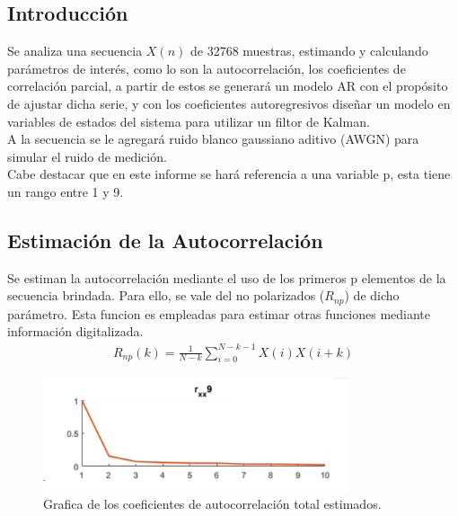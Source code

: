 







\tableofcontents
\newpage



\subsection{Introducción}

Se analiza una secuencia $X(n)$ de 32768 muestras, estimando y calculando parámetros de interés, como lo son la autocorrelación, los coeficientes de correlación parcial, a partir de estos se generará un modelo AR con el propósito de ajustar dicha serie, y con los coeficientes autoregresivos diseñar un modelo en variables de estados del sistema para utilizar un filtor de Kalman.\\
A la secuencia se le agregará ruido blanco gaussiano aditivo (AWGN) para simular el ruido de medición.\\
Cabe destacar que en este informe se hará referencia a una variable p, esta tiene un rango entre 1 y 9.\\

\subsection{Estimación de la Autocorrelación} 

Se estiman la autocorrelación mediante el uso de los primeros p elementos de la secuencia brindada. Para ello, se vale del  no polarizados ($R_{np}$) de dicho parámetro. Esta funcion es  empleadas para estimar otras funciones mediante información digitalizada.
\begin{equation}
\begin{gathered}
	R_{np}(k) = \frac{1}{N-k} \sum_{i=0}^{N-k-1} X(i)X(i+k)
\end{gathered}
\end{equation}


\begin{figure}[H]
\centering
	\includegraphics[width=0.8\textwidth, trim = {0 0 0 0},clip]{./Imagenes/correlacion.png}
	\caption{Grafica de los coeficientes de autocorrelación total estimados.}
	\label{fig:rxx}
\end{figure}



